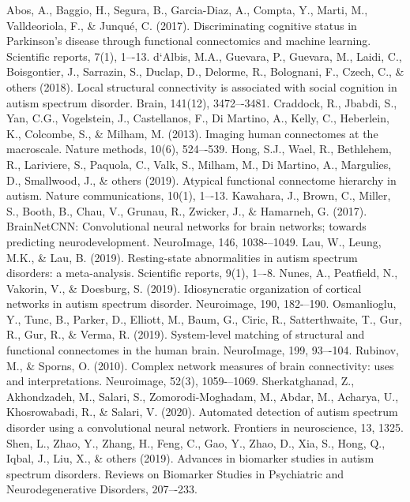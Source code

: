 \documentclass[conference]{IEEEtran}
\begin{document}
\begin{thebibliography}{00}
     {Abos, A., Baggio, H., Segura, B., Garcia-Diaz, A., Compta, Y., Marti, M., Valldeoriola, F., \& Junqué, C. (2017). Discriminating cognitive status in Parkinson’s disease through functional connectomics and machine learning. Scientific reports, 7(1), 1–-13.}
     {d`Albis, M.A., Guevara, P., Guevara, M., Laidi, C., Boisgontier, J., Sarrazin, S., Duclap, D., Delorme, R., Bolognani, F., Czech, C., \& others (2018). Local structural connectivity is associated with social cognition in autism spectrum disorder. Brain, 141(12), 3472–-3481.}
     {Craddock, R., Jbabdi, S., Yan, C.G., Vogelstein, J., Castellanos, F., Di Martino, A., Kelly, C., Heberlein, K., Colcombe, S., \& Milham, M. (2013). Imaging human connectomes at the macroscale. Nature methods, 10(6), 524–-539.}
     {Hong, S.J., Wael, R., Bethlehem, R., Lariviere, S., Paquola, C., Valk, S., Milham, M., Di Martino, A., Margulies, D., Smallwood, J., \& others (2019). Atypical functional connectome hierarchy in autism. Nature communications, 10(1), 1–-13.}
     {Kawahara, J., Brown, C., Miller, S., Booth, B., Chau, V., Grunau, R., Zwicker, J., \& Hamarneh, G. (2017). BrainNetCNN: Convolutional neural networks for brain networks; towards predicting neurodevelopment. NeuroImage, 146, 1038-–1049.}
     {Lau, W., Leung, M.K., \& Lau, B. (2019). Resting-state abnormalities in autism spectrum disorders: a meta-analysis. Scientific reports, 9(1), 1–-8.}
     {Nunes, A., Peatfield, N., Vakorin, V., \& Doesburg, S. (2019). Idiosyncratic organization of cortical networks in autism spectrum disorder. Neuroimage, 190, 182-–190.}
     {Osmanlioglu, Y., Tunc, B., Parker, D., Elliott, M., Baum, G., Ciric, R., Satterthwaite, T., Gur, R., Gur, R., \& Verma, R. (2019). System-level matching of structural and functional connectomes in the human brain. NeuroImage, 199, 93–-104.}
     {Rubinov, M., \& Sporns, O. (2010). Complex network measures of brain connectivity: uses and interpretations. Neuroimage, 52(3), 1059-–1069.}
     {Sherkatghanad, Z., Akhondzadeh, M., Salari, S., Zomorodi-Moghadam, M., Abdar, M., Acharya, U., Khosrowabadi, R., \& Salari, V. (2020). Automated detection of autism spectrum disorder using a convolutional neural network. Frontiers in neuroscience, 13, 1325.}
     {Shen, L., Zhao, Y., Zhang, H., Feng, C., Gao, Y., Zhao, D., Xia, S., Hong, Q., Iqbal, J., Liu, X., \& others (2019). Advances in biomarker studies in autism spectrum disorders. Reviews on Biomarker Studies in Psychiatric and Neurodegenerative Disorders, 207–-233.}

\end{thebibliography}
\end{document}
